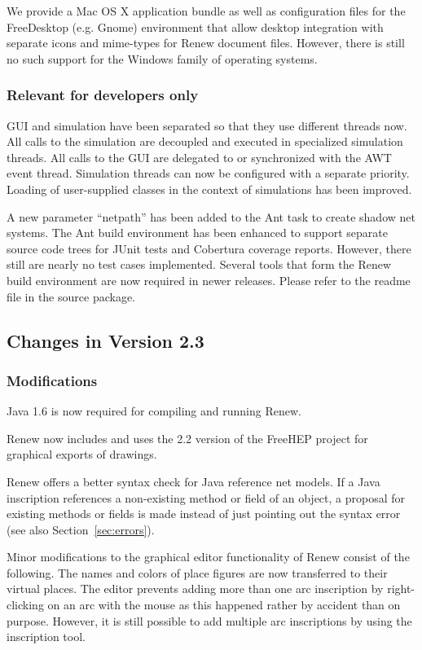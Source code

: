 We provide a Mac OS X application bundle as well as configuration files for
the FreeDesktop (e.g. Gnome) environment that allow desktop integration
with separate icons and mime-types for Renew document files.
However, there is still no such support for the Windows family of operating
systems.

\subsubsection*{Relevant for developers only}

GUI and simulation have been separated so that they use different threads now. 
All calls to the simulation are decoupled and executed in specialized
simulation threads.
All calls to the GUI are delegated to or synchronized with the AWT event
thread.
Simulation threads can now be configured with a separate priority.
Loading of user-supplied classes in the context of simulations has been improved.

A new parameter ``netpath'' has been added to the Ant task to create shadow
net systems.
The Ant build environment has been enhanced to support separate source
code trees for JUnit tests and Cobertura coverage reports.
However, there still are nearly no test cases implemented.
Several tools that form the Renew build environment are now required in newer releases.
Please refer to the readme file in the source package.

\subsection{Changes in Version 2.3}
\label{sec:changes-2.3}

\subsubsection*{Modifications}

Java 1.6 is now required for compiling and running Renew.

Renew now includes and uses the 2.2 version of the FreeHEP project for
graphical exports of drawings.

Renew offers a better syntax check for Java reference net
models. If a Java inscription references a non-existing method or
field of an object, a proposal for existing methods or fields is
made instead of just pointing out the syntax error (see also
Section~\ref{sec:errors}).

Minor modifications to the graphical editor functionality of Renew
consist of the following. The names and colors of place figures are
now transferred to their virtual places. The editor prevents adding
more than one arc inscription by right-clicking on an arc with the
mouse as this happened rather by accident than on purpose. However, it
is still possible to add multiple arc inscriptions by using the
inscription tool.

